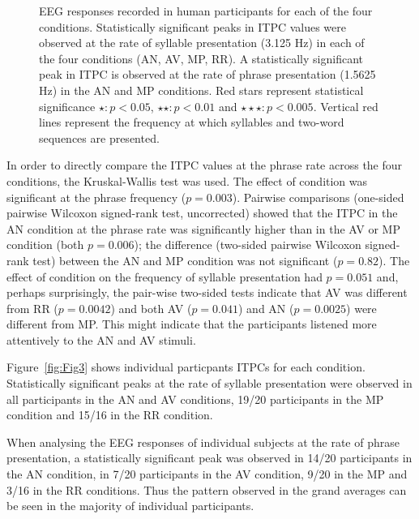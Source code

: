 \documentclass[11pt,a4wide]{article}
\begin{document}
\begin{figure}[tbhp]

\caption{EEG responses recorded in human participants for each of the
  four conditions. Statistically significant peaks in ITPC values were
  observed at the rate of syllable presentation (3.125 Hz) in each of
  the four conditions (AN, AV, MP, RR). A statistically significant
  peak in ITPC is observed at the rate of phrase presentation (1.5625
  Hz) in the AN and MP conditions. Red stars
  represent statistical significance $\star: p<0.05$, $\star\star: p<0.01$ and
  $\star\star\star: p<0.005$. Vertical red lines represent the
  frequency at which syllables and two-word sequences are presented.}
\label{fig:Fig2}
\end{figure}

In order to directly compare the ITPC values at the phrase rate across
the four conditions, the Kruskal-Wallis test was used. The effect of
condition was significant at the phrase frequency
($p=0.003$). Pairwise comparisons (one-sided pairwise Wilcoxon
signed-rank test, uncorrected) showed that the ITPC in the AN
condition at the phrase rate was significantly higher than in the AV
or MP condition (both $p=0.006$); the difference (two-sided pairwise
Wilcoxon signed-rank test) between the AN and MP condition was not
significant ($p=0.82$). The effect of condition on the frequency of
syllable presentation had $p=0.051$ and, perhaps surprisingly, the
pair-wise two-sided tests indicate that AV was different from RR
($p=0.0042$) and both AV ($p=0.041$) and AN ($p=0.0025$) were
different from MP. This might indicate that the participants listened
more attentively to the AN and AV stimuli.


Figure~\ref{fig:Fig3} shows individual particpants ITPCs for each
condition. Statistically significant peaks at the rate of syllable
presentation were observed in all participants in the AN and AV
conditions, 19/20 participants in the MP condition and 15/16 in the RR
condition.

When analysing the EEG responses of individual subjects at the rate of
phrase presentation, a statistically significant peak was observed in
14/20 participants in the AN condition, in 7/20 participants in the AV
condition, 9/20 in the MP and 3/16 in the RR conditions. Thus the
pattern observed in the grand averages can be seen in the majority of
individual participants.
\end{document}
